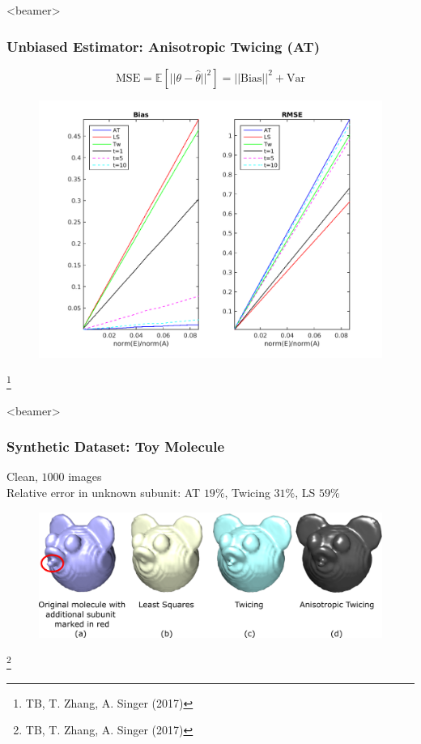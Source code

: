 \documentclass{beamer}
\newcommand\blfootnote[1]{%
  \begingroup
  \renewcommand\thefootnote{}\footnote{#1}%
  \addtocounter{footnote}{-1}%
  \endgroup
}
\begin{document}
\begin{frame}<beamer>
\frametitle{Unbiased Estimator: Anisotropic Twicing (AT) }
\begin{equation*}
\label{eqn:biasvar}
\text{MSE}=\mathbb{E}[||\theta-\hat{\theta}||^2] = ||\text{Bias}||^2 + \text{Var} \nonumber
\end{equation*}
\begin{figure}[!htbp]
\begin{center}
\includegraphics[scale=0.35]{figures/anis_bias_family.png}
\end{center}
\end{figure}\blfootnote{TB, T. Zhang, A. Singer (2017)}
\end{frame}

\begin{frame}<beamer>
\frametitle{Synthetic Dataset: Toy Molecule }
Clean, $1000$ images\\
Relative error in unknown subunit: AT $19\%$, Twicing $31\%$, LS $59\%$ 
\begin{figure}[!htbp]
\begin{center}
\includegraphics[scale=0.16]{figures/mickey.pdf}
\end{center}
\end{figure}\blfootnote{TB, T. Zhang, A. Singer (2017)}

\end{frame}
\end{document}
